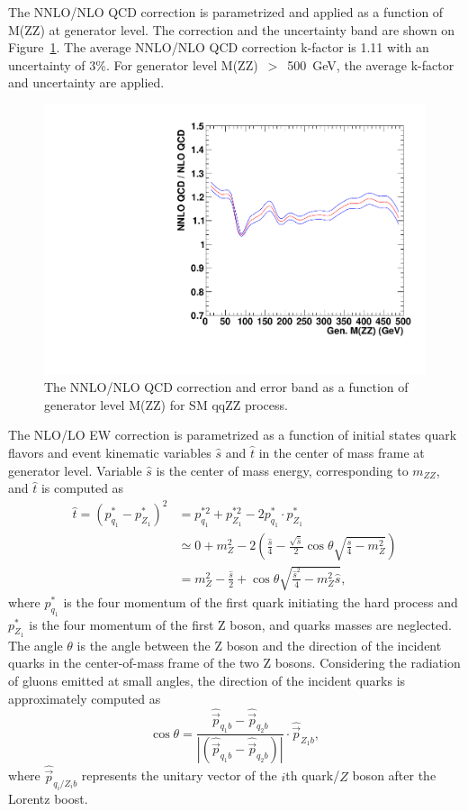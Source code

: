 \vspace{0.3cm}
The NNLO/NLO QCD correction is parametrized and applied as a function of M(ZZ) 
at generator level. 
The correction and the uncertainty band are shown on Figure~\ref{fig:qqzz_nnlo_qcd}.
The average NNLO/NLO QCD correction k-factor is 1.11 with an uncertainty of 3\%.
For generator level M(ZZ)~$>$~500~GeV, the average k-factor and uncertainty are applied. 

\begin{figure}[htbp!]
\centering
  \includegraphics[width=0.48\linewidth]{figures/h_nnlo_to_nlo_vs_mzz.pdf}
  \caption{The NNLO/NLO QCD correction and error band as a function of generator level M(ZZ) for SM qqZZ process.}
  \label{fig:qqzz_nnlo_qcd}
\end{figure}

\vspace{0.3cm}
The NLO/LO EW correction is parametrized as a function of initial states quark flavors and event kinematic variables $\hat{s}$ and $\hat{t}$
in the center of mass frame at generator level. 
Variable $\hat{s}$ is the center of mass energy, corresponding to $m_{ZZ}$,
and $\hat{t}$ is computed as
\begin{align*}
\hat{t} = \left(p^*_{q_1}-p^*_{Z_1}\right)^2 & = p_{q_1}^{*2} +
p_{Z_1}^{*2} - 2 p^*_{q_1} \cdot p^*_{Z_1} \\
& \simeq 0 + m_{Z}^{2} - 2 \left( \frac{\hat{s}}{4} -
\frac{\sqrt{\hat{s}}}{2} \cos{\theta} \sqrt{\frac{\hat{s}}{4} -
m_{Z}^{2}} \right) \\
& = m_{Z}^{2} - \frac{\hat{s}}{2} + \cos{\theta}
\sqrt{\frac{\hat{s}^2}{4} - m_{Z}^{2}\hat{s}},
\end{align*}
where $p^*_{q_1}$ is the four momentum of the first quark initiating the hard process and 
$p^*_{Z_1}$  is the four momentum of the first Z boson, and quarks masses are neglected.
The angle $\theta$ is the angle between the Z boson and the direction of the
incident quarks in the center-of-mass frame of the two Z bosons. 
Considering the radiation of gluons emitted at small angles, the direction of the incident
quarks is approximately computed as 
\begin{equation*}
\cos{\theta} = \frac{\hat{\vec{p}}_{q_1b} -
\hat{\vec{p}}_{q_2b}}{\left|\left( \hat{\vec{p}}_{q_1b} -
\hat{\vec{p}}_{q_2b} \right)\right|} \cdot \hat{\vec{p}}_{Z_1b},
\end{equation*}
where $\hat{\vec{p}}_{q_i/Z_ib}$ represents the unitary vector of the
$i$th quark/$Z$ boson after the Lorentz boost. 


